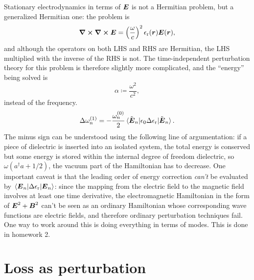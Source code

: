 \documentclass[hyperref, a4paper]{article}
\newcommand{\epsr}{\epsilon_{\text{r}}}
\begin{document}
Stationary electrodynamics in terms of $\vb*{E}$ is not a Hermitian problem, 
but a generalized Hermitian one:
the problem is 
\begin{equation}
    \curl{\curl{\vb*{E}}} = \left(\frac{\omega}{c}\right)^2 \epsr(\vb*{r}) \vb*{E}(\vb*{r}),
\end{equation}
and although the operators on both LHS and RHS are Hermitian, 
the LHS multiplied with the inverse of the RHS is not.
The time-independent perturbation theory for this problem is therefore slightly more complicated, 
and the ``energy'' being solved is 
\begin{equation}
    \alpha \coloneqq \frac{\omega^2}{c^2},
\end{equation}
instead of the frequency. 
\begin{equation}
    \Delta \omega^{(1)}_n = - \frac{\omega_n^{(0)}}{2} \mel*{\tilde{\vb*{E}}_n}{\epsilon_0 \Delta \epsr}{\tilde{\vb*{E}}_n}.
    \label{eq:first-order-delta-eps}
\end{equation}
The minus sign can be understood using the following line of argumentation:
if a piece of dielectric is inserted into an isolated system, 
the total energy is conserved but some energy is stored 
within the internal degree of freedom dielectric, 
so $\omega (a^\dagger a + 1/2)$, the vacuum part of the Hamiltonian has to decrease.
One important caveat is that the leading order of energy correction 
\emph{can't} be evaluated by $\mel*{\vb*{E}_n}{\Delta \epsr}{\vb*{E}_n}$:
since the mapping from the electric field to the magnetic field 
involves at least one time derivative, 
the electromagnetic Hamiltonian in the form of $\vb*{E}^2 + \vb*{B}^2$
can't be seen as an ordinary Hamiltonian whose corresponding wave functions are electric fields, 
and therefore ordinary perturbation techniques fail.
One way to work around this is doing everything in terms of modes.
This is done in homework 2. 

\section{Loss as perturbation}
\end{document}
